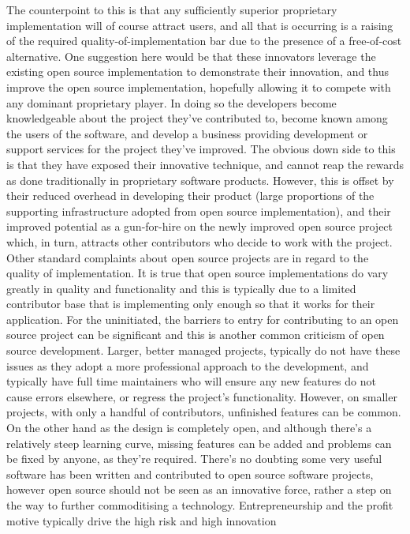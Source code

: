  The counterpoint to this
is that any sufficiently superior proprietary implementation will of course attract
users, and all that is occurring is a raising of the required quality-of-implementation
bar due to the presence of a free-of-cost alternative. One suggestion here would be
that these innovators leverage the existing open source implementation to demonstrate
their innovation, and thus improve the open source implementation, hopefully
allowing it to compete with any dominant proprietary player. In doing so the developers
become knowledgeable about the project they’ve contributed to, become
known among the users of the software, and develop a business providing development
or support services for the project they’ve improved. The obvious down side
to this is that they have exposed their innovative technique, and cannot reap the
rewards as done traditionally in proprietary software products. However, this is
offset by their reduced overhead in developing their product (large proportions of
the supporting infrastructure adopted from open source implementation), and their
improved potential as a gun-for-hire on the newly improved open source project
which, in turn, attracts other contributors who decide to work with the project.
Other standard complaints about open source projects are in regard to the quality
of implementation. It is true that open source implementations do vary greatly
in quality and functionality and this is typically due to a limited contributor base
that is implementing only enough so that it works for their application. For the
uninitiated, the barriers to entry for contributing to an open source project can
be significant and this is another common criticism of open source development.
Larger, better managed projects, typically do not have these issues as they adopt a
more professional approach to the development, and typically have full time maintainers
who will ensure any new features do not cause errors elsewhere, or regress
the project’s functionality. However, on smaller projects, with only a handful of
contributors, unfinished features can be common. On the other hand as the design
is completely open, and although there’s a relatively steep learning curve, missing
features can be added and problems can be fixed by anyone, as they’re required.
There’s no doubting some very useful software has been written and contributed
to open source software projects, however open source should not be seen as an innovative
force, rather a step on the way to further commoditising a technology.
Entrepreneurship and the profit motive typically drive the high risk and high innovation

